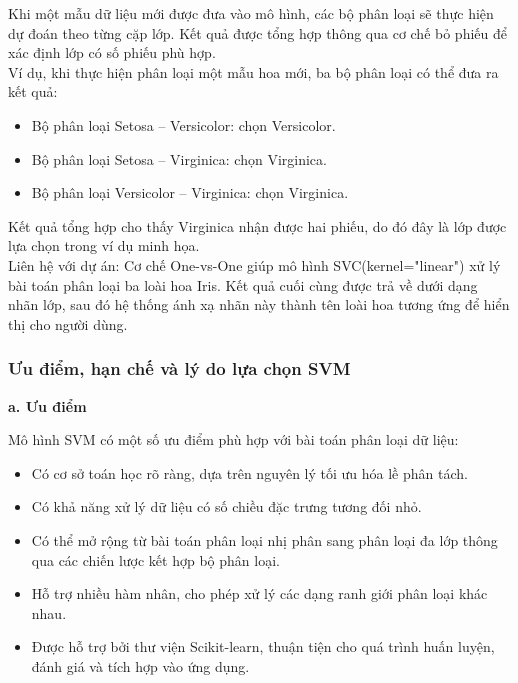 \documentclass[14pt]{extarticle}
\begin{document}
		\noindent
		Khi một mẫu dữ liệu mới được đưa vào mô hình, các bộ phân loại sẽ thực hiện dự đoán theo từng cặp lớp. Kết quả được tổng hợp thông qua cơ chế bỏ phiếu để xác định lớp có số phiếu phù hợp.\\
		
		\noindent
		Ví dụ, khi thực hiện phân loại một mẫu hoa mới, ba bộ phân loại có thể đưa ra kết quả:
		
		\begin{itemize}
			\item Bộ phân loại Setosa -- Versicolor: chọn Versicolor.
			\item Bộ phân loại Setosa -- Virginica: chọn Virginica.
			\item Bộ phân loại Versicolor -- Virginica: chọn Virginica.
		\end{itemize}
		
		\noindent
		Kết quả tổng hợp cho thấy Virginica nhận được hai phiếu, do đó đây là lớp được lựa chọn trong ví dụ minh họa.\\
		
		\noindent
		Liên hệ với dự án: Cơ chế One-vs-One giúp mô hình SVC(kernel="linear") xử lý bài toán phân loại ba loài hoa Iris. Kết quả cuối cùng được trả về dưới dạng nhãn lớp, sau đó hệ thống ánh xạ nhãn này thành tên loài hoa tương ứng để hiển thị cho người dùng.
		
		\subsubsection{Ưu điểm, hạn chế và lý do lựa chọn SVM}
		
		\textbf{ a. Ưu điểm}
		
		\noindent
		Mô hình SVM có một số ưu điểm phù hợp với bài toán phân loại dữ liệu:
		
		\begin{itemize}
			\item Có cơ sở toán học rõ ràng, dựa trên nguyên lý tối ưu hóa lề phân tách.
			\item Có khả năng xử lý dữ liệu có số chiều đặc trưng tương đối nhỏ.
			\item Có thể mở rộng từ bài toán phân loại nhị phân sang phân loại đa lớp thông qua các chiến lược kết hợp bộ phân loại.
			\item Hỗ trợ nhiều hàm nhân, cho phép xử lý các dạng ranh giới phân loại khác nhau.
			\item Được hỗ trợ bởi thư viện Scikit-learn, thuận tiện cho quá trình huấn luyện, đánh giá và tích hợp vào ứng dụng.
		\end{itemize}
		
\end{document}

